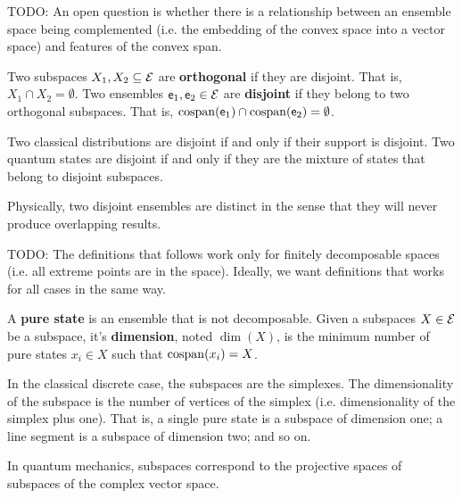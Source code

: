 \begin{remark}
	TODO: An open question is whether there is a relationship between an ensemble space being complemented (i.e. the embedding of the convex space into a vector space) and features of the convex span.
\end{remark}

\begin{defn}
	Two subspaces $X_1, X_2 \subseteq \mathcal{E}$ are \textbf{orthogonal} if they are disjoint. That is, $X_1 \cap X_2 = \emptyset$. Two ensembles $\mathsf{e}_1, \mathsf{e}_2 \in \mathcal{E}$ are \textbf{disjoint} if they belong to two orthogonal subspaces. That is, $\mathrm{cospan}(\mathsf{e}_1) \cap \mathrm{cospan}(\mathsf{e}_2) = \emptyset$.
\end{defn}

\begin{remark}
	Two classical distributions are disjoint if and only if their support is disjoint. Two quantum states are disjoint if and only if they are the mixture of states that belong to disjoint subspaces.
	
	Physically, two disjoint ensembles are distinct in the sense that they will never produce overlapping results.
\end{remark}

\begin{remark}
	TODO: The definitions that follows work only for finitely decomposable spaces (i.e. all extreme points are in the space). Ideally, we want definitions that works for all cases in the same way.
\end{remark}

\begin{defn}
	A \textbf{pure state} is an ensemble that is not decomposable. Given a subspaces $X \in \mathcal{E}$ be a subspace, it's \textbf{dimension}, noted $\dim(X)$, is the minimum number of pure states $x_i \in X$ such that $\mathrm{cospan}(x_i) = X$.
\end{defn}

\begin{remark}
	In the classical discrete case, the subspaces are the simplexes. The dimensionality of the subspace is the number of vertices of the simplex (i.e. dimensionality of the simplex plus one). That is, a single pure state is a subspace of dimension one; a line segment is a subspace of dimension two; and so on.
	
	In quantum mechanics, subspaces correspond to the projective spaces of subspaces of the complex vector space.
\end{remark}


